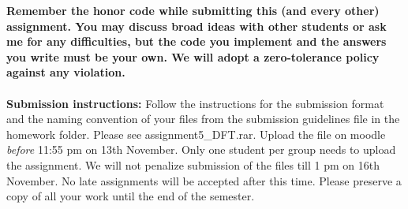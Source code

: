 \documentclass[11pt]{article}
\begin{document}
\maketitle

\textbf{Remember the honor code while submitting this (and every other) assignment. You may discuss broad ideas with other students or ask me for any difficulties, but the code you implement and the answers you write must be your own. We will adopt a \textbf{zero-tolerance policy} against any violation.}
\\
\\
\textbf{Submission instructions:} Follow the instructions for the submission format and the naming convention of your files from the submission guidelines file in the homework folder. Please see \textsf{assignment5\_DFT.rar}. Upload the file on moodle \emph{before} 11:55 pm on 13th November.  Only one student per group needs to upload the assignment. We will not penalize submission of the files till 1 pm on 16th November. No late assignments will be accepted after this time. Please preserve a copy of all your work until the end of the semester.  
\end{document}
